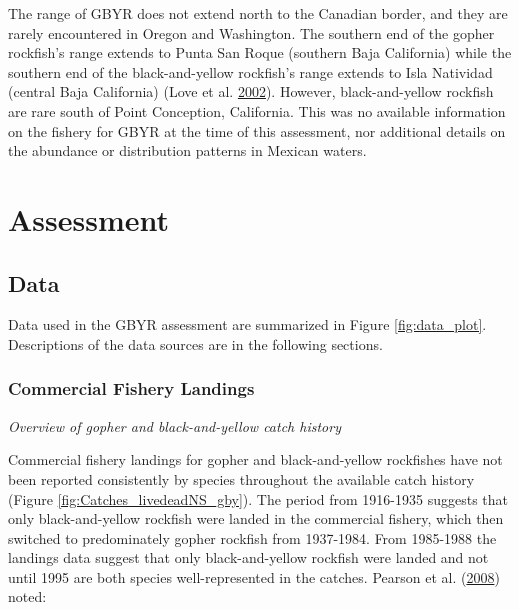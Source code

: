 \documentclass[12pt,]{article}
\begin{document}
The range of GBYR does not extend north to the Canadian border, and they
are rarely encountered in Oregon and Washington. The southern end of the
gopher rockfish's range extends to Punta San Roque (southern Baja
California) while the southern end of the black-and-yellow rockfish's
range extends to Isla Natividad (central Baja California) (Love et al.
\protect\hyperlink{ref-Love2002}{2002}). However, black-and-yellow
rockfish are rare south of Point Conception, California. This was no
available information on the fishery for GBYR at the time of this
assessment, nor additional details on the abundance or distribution
patterns in Mexican waters.

\section{Assessment}\label{assessment}

\subsection{Data}\label{data}

Data used in the GBYR assessment are summarized in Figure
\ref{fig:data_plot}. Descriptions of the data sources are in the
following sections.

\subsubsection{Commercial Fishery
Landings}\label{commercial-fishery-landings}

\emph{Overview of gopher and black-and-yellow catch history}

Commercial fishery landings for gopher and black-and-yellow rockfishes
have not been reported consistently by species throughout the available
catch history (Figure \ref{fig:Catches_livedeadNS_gby}). The period from
1916-1935 suggests that only black-and-yellow rockfish were landed in
the commercial fishery, which then switched to predominately gopher
rockfish from 1937-1984. From 1985-1988 the landings data suggest that
only black-and-yellow rockfish were landed and not until 1995 are both
species well-represented in the catches. Pearson et al.
(\protect\hyperlink{ref-Pearson2008}{2008}) noted:
\end{document}
